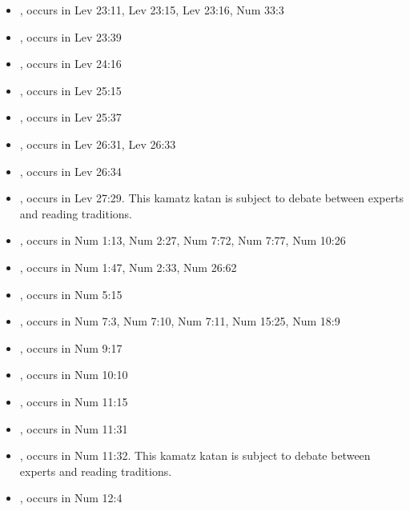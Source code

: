 \documentclass[14pt]{article}
\begin{document}
\begin{itemize}
\item {}, occurs in Lev 23:11, Lev 23:15, Lev 23:16, Num 33:3

\item {}, occurs in Lev 23:39

\item {}, occurs in Lev 24:16

\item {}, occurs in Lev 25:15

\item {}, occurs in Lev 25:37

\item {}, occurs in Lev 26:31, Lev 26:33

\item {}, occurs in Lev 26:34

\item {}, occurs in Lev 27:29. This kamatz katan is subject to debate between experts and reading traditions.

\item {}, occurs in Num 1:13, Num 2:27, Num 7:72, Num 7:77, Num 10:26

\item {}, occurs in Num 1:47, Num 2:33, Num 26:62

\item {}, occurs in Num 5:15

\item {}, occurs in Num 7:3, Num 7:10, Num 7:11, Num 15:25, Num 18:9

\item {}, occurs in Num 9:17

\item {}, occurs in Num 10:10

\item {}, occurs in Num 11:15

\item {}, occurs in Num 11:31

\item {}, occurs in Num 11:32. This kamatz katan is subject to debate between experts and reading traditions.

\item {}, occurs in Num 12:4


\end{itemize}
\end{document}
